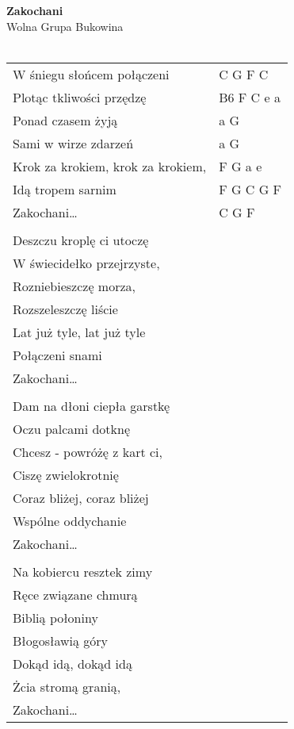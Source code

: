 \documentclass[a5paper]{article}
\begin{document}


\noindent
\fontsize{12pt}{15pt}\selectfont
\textbf{Zakochani} \\
\fontsize{8pt}{10pt}\selectfont
Wolna Grupa Bukowina \\ \\
\fontsize{10pt}{12pt}\selectfont
{}
\begin{tabular}{@{}p{6.50cm}p{3cm}@{}}
\noindent
W śniegu słońcem połączeni & C G F C \\
Plotąc tkliwości przędzę & B6 F C e a \\
Ponad czasem żyją & a G \\
Sami w wirze zdarzeń & a G \\
Krok za krokiem, krok za krokiem, & F G a e \\
Idą tropem sarnim & F G C G F \\
Zakochani… & C G F \\ \\

Deszczu kroplę ci utoczę \\
W świecidełko przejrzyste, \\
Rozniebieszczę morza, \\
Rozszeleszczę liście \\
Lat już tyle, lat już tyle \\
Połączeni snami \\
Zakochani… \\ \\

Dam na dłoni ciepła garstkę \\
Oczu palcami dotknę \\
Chcesz - powróżę z kart ci, \\
Ciszę zwielokrotnię \\
Coraz bliżej, coraz bliżej \\
Wspólne oddychanie \\
Zakochani… \\ \\

Na kobiercu resztek zimy \\
Ręce związane chmurą \\
Biblią połoniny \\
Błogosławią góry \\
Dokąd idą, dokąd idą \\
Żcia stromą granią, \\
Zakochani…
\end{tabular}
\end{document}
